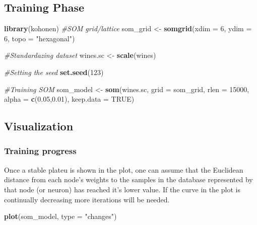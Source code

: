\documentclass[]{book}
\newenvironment{Shaded}{\begin{snugshade}}{\end{snugshade}}
\newcommand{\KeywordTok}[1]{\textcolor[rgb]{0.13,0.29,0.53}{\textbf{{#1}}}}
\newcommand{\DataTypeTok}[1]{\textcolor[rgb]{0.13,0.29,0.53}{{#1}}}
\newcommand{\DecValTok}[1]{\textcolor[rgb]{0.00,0.00,0.81}{{#1}}}
\newcommand{\FloatTok}[1]{\textcolor[rgb]{0.00,0.00,0.81}{{#1}}}
\newcommand{\StringTok}[1]{\textcolor[rgb]{0.31,0.60,0.02}{{#1}}}
\newcommand{\CommentTok}[1]{\textcolor[rgb]{0.56,0.35,0.01}{\textit{{#1}}}}
\newcommand{\OtherTok}[1]{\textcolor[rgb]{0.56,0.35,0.01}{{#1}}}
\newcommand{\NormalTok}[1]{{#1}}
\begin{document}
\subsection{Training Phase}\label{training-phase}

\begin{Shaded}
\begin{Highlighting}[]
\KeywordTok{library}\NormalTok{(kohonen)}
\CommentTok{#SOM grid/lattice}
\NormalTok{som_grid <-}\StringTok{ }\KeywordTok{somgrid}\NormalTok{(}\DataTypeTok{xdim =} \DecValTok{6}\NormalTok{, }\DataTypeTok{ydim =} \DecValTok{6}\NormalTok{, }\DataTypeTok{topo =} \StringTok{"hexagonal"}\NormalTok{)}

\CommentTok{#Standardazing dataset}
\NormalTok{wines.sc <-}\StringTok{ }\KeywordTok{scale}\NormalTok{(wines)}

\CommentTok{#Setting the seed}
\KeywordTok{set.seed}\NormalTok{(}\DecValTok{123}\NormalTok{)}

\CommentTok{#Training SOM}
\NormalTok{som_model <-}\StringTok{ }\KeywordTok{som}\NormalTok{(wines.sc,}
                 \DataTypeTok{grid =} \NormalTok{som_grid,}
                 \DataTypeTok{rlen =} \DecValTok{15000}\NormalTok{,}
                 \DataTypeTok{alpha =} \KeywordTok{c}\NormalTok{(}\FloatTok{0.05}\NormalTok{,}\FloatTok{0.01}\NormalTok{),}
                 \DataTypeTok{keep.data =} \OtherTok{TRUE}\NormalTok{)}
\end{Highlighting}
\end{Shaded}

\subsection{Visualization}\label{visualization}

\subsubsection{Training progress}\label{training-progress}

Once a stable plateu is shown in the plot, one can assume that the
Euclidean distance from each node's weights to the samples in the
database represented by that node (or neuron) has reached it's lower
value. If the curve in the plot is continually decreasing more
iterations will be needed.

\begin{Shaded}
\begin{Highlighting}[]
\KeywordTok{plot}\NormalTok{(som_model, }\DataTypeTok{type =} \StringTok{"changes"}\NormalTok{)}
\end{Highlighting}
\end{Shaded}
\end{document}
